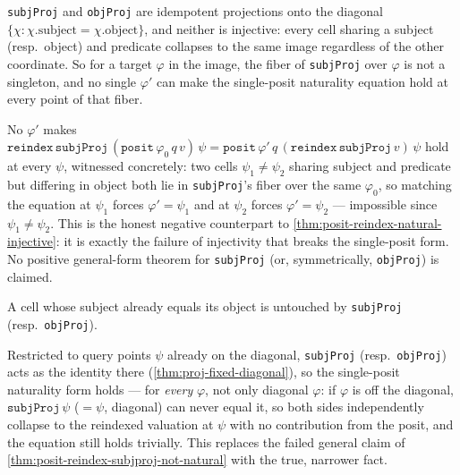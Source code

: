 \texttt{subjProj} and \texttt{objProj} are idempotent projections onto the
diagonal \(\{\chi : \chi.\mathrm{subject} = \chi.\mathrm{object}\}\), and
neither is injective: every cell sharing a subject (resp.\ object) and
predicate collapses to the same image regardless of the other coordinate.
So for a target \(\varphi\) in the image, the fiber of \texttt{subjProj}
over \(\varphi\) is not a singleton, and no single \(\varphi'\) can make the
single-posit naturality equation hold at every point of that fiber.

\begin{theorem}\label{thm:posit-reindex-subjproj-not-natural}\leanok{}
No \(\varphi'\) makes
\(\texttt{reindex}\,\texttt{subjProj}\,(\texttt{posit}\,\varphi_0\,q\,v)\,\psi
= \texttt{posit}\,\varphi'\,q\,(\texttt{reindex}\,\texttt{subjProj}\,v)\,\psi\)
hold at every \(\psi\), witnessed concretely: two cells \(\psi_1 \ne \psi_2\)
sharing subject and predicate but differing in object both lie in
\texttt{subjProj}'s fiber over the same \(\varphi_0\), so matching the
equation at \(\psi_1\) forces \(\varphi' = \psi_1\) and at \(\psi_2\) forces
\(\varphi' = \psi_2\) --- impossible since \(\psi_1 \ne \psi_2\). This is the
honest negative counterpart to \cref{thm:posit-reindex-natural-injective}:
it is exactly the failure of injectivity that breaks the single-posit form.
No positive general-form theorem for \texttt{subjProj} (or, symmetrically,
\texttt{objProj}) is claimed.
\end{theorem}

\begin{proposition}\label{thm:proj-fixed-diagonal}\leanok{}
A cell whose subject already equals its object is untouched by
\texttt{subjProj} (resp.\ \texttt{objProj}).
\end{proposition}

\begin{theorem}\label{thm:posit-reindex-proj-diagonal}\leanok{}
Restricted to query points \(\psi\) already on the diagonal, \texttt{subjProj}
(resp.\ \texttt{objProj}) acts as the identity there
(\cref{thm:proj-fixed-diagonal}), so the single-posit naturality form holds
--- for \emph{every} \(\varphi\), not only diagonal \(\varphi\): if
\(\varphi\) is off the diagonal, \(\texttt{subjProj}\,\psi\) (\(=\psi\),
diagonal) can never equal it, so both sides independently collapse to the
reindexed valuation at \(\psi\) with no contribution from the posit, and the
equation still holds trivially. This replaces the failed general claim of
\cref{thm:posit-reindex-subjproj-not-natural} with the true, narrower fact.
\end{theorem}

